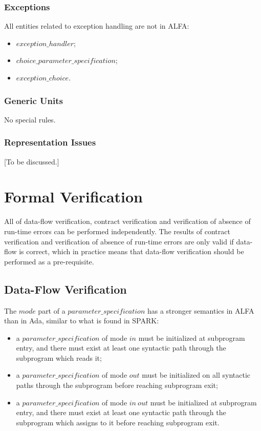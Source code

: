 \documentclass[fullpage]{article}
\newcommand{\bnf}[1]{$\mathit{#1}$}
\begin{document}
\subsubsection{Exceptions}

All entities related to exception handling are not in ALFA:
\begin{itemize}
\item \bnf{exception\_handler};
\item \bnf{choice\_parameter\_specification};
\item \bnf{exception\_choice}.
\end{itemize}

\subsubsection{Generic Units}

No special rules.

\subsubsection{Representation Issues}

[To be discussed.]

\section{Formal Verification}

All of data-flow verification, contract verification and verification of
absence of run-time errors can be performed independently. The results of
contract verification and verification of absence of run-time errors are only
valid if data-flow is correct, which in practice means that data-flow
verification should be performed as a pre-requisite.

\subsection{Data-Flow Verification}

The \bnf{mode} part of a \bnf{parameter\_specification} has a stronger
semantics in ALFA than in Ada, similar to what is found in SPARK:
\begin{itemize}
\item a \bnf{parameter\_specification} of mode \bnf{in} must be initialized at
  subprogram entry, and there must exist at least one syntactic path through
  the subprogram which reads it;
\item a \bnf{parameter\_specification} of mode \bnf{out} must be initialized on
  all syntactic paths through the subprogram before reaching subprogram exit;
\item a \bnf{parameter\_specification} of mode \bnf{in\ out} must be initialized
  at subprogram entry, and there must exist at least one syntactic path through
  the subprogram which assigns to it before reaching subprogram exit.
\end{itemize}
\end{document}
